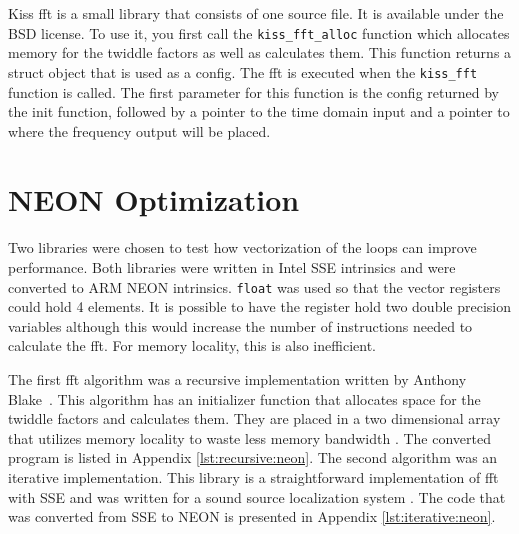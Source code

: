 Kiss \gls{fft} is a small library that consists of one source file. It is available under the BSD license. To use it, you first call the \texttt{kiss\_fft\_alloc} function which allocates memory for the twiddle factors as well as calculates them. This function returns a struct object that is used as a config. The \gls{fft} is executed when the \texttt{kiss\_fft} function is called. The first parameter for this function is the config returned by the init function, followed by a pointer to the time domain input and a pointer to where the frequency output will be placed.



\section{NEON Optimization}

Two libraries were chosen to test how vectorization of the loops can improve performance. Both libraries were written in Intel SSE intrinsics and were converted to ARM NEON intrinsics. \texttt{float} was used so that the vector registers could hold 4 elements. It is possible to have the register hold two double precision variables although this would increase the number of instructions needed to calculate the \gls{fft}. For memory locality, this is also inefficient.

The first \gls{fft} algorithm was a recursive implementation written by Anthony Blake~\cite{neon:recursive}. This algorithm has an initializer function that allocates space for the twiddle factors and calculates them. They are placed in a two dimensional array that utilizes memory locality to waste less memory bandwidth \cite{neon:recursive:details}. The converted program is listed in Appendix \ref{lst:recursive:neon}. The second algorithm was an iterative implementation. This library is a straightforward implementation of \gls{fft} with SSE \cite{code:manyears} and was written for a sound source localization system \cite{manyears:site}. The code that was converted from SSE to NEON is presented in Appendix \ref{lst:iterative:neon}.
